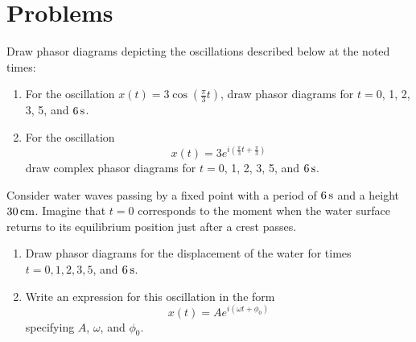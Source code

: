








\newpage


\section*{Problems}


\begin{problem}
Draw phasor diagrams depicting the oscillations described below at the noted times:
  \begin{enumerate}
  \item For the oscillation $x(t) = 3\cos\left(\frac{\pi}{3}t\right)$, draw
phasor diagrams for $t = 0$, 1, 2, 3, 5, and $6\,\mbox{s}$.
  \item For the oscillation 
 \[ x(t) = 3e^{i\left(\frac{\pi}{3}t + \frac{\pi}{3}\right)} \]
draw complex phasor diagrams for $t = 0$, 1, 2, 3, 5, and $6\,\mbox{s}$.
  \end{enumerate}
\end{problem}


\begin{problem}
Consider water waves passing by a fixed point with a period  
of $6\,\mbox{s}$ and a height $30\,\mbox{cm}$. Imagine 
that $t=0$ corresponds to the moment when the water surface returns 
to its equilibrium position just after a crest passes.
  \begin{enumerate}
  \item Draw phasor diagrams for the displacement of the water for times 
$t = 0, 1, 2, 3, 5$, and $6\,\mbox{s}$.
  \item Write an expression for this oscillation in the form
\[ x(t) = Ae^{i\left(\omega t + \phi_0\right)}   \]
specifying $A$, $\omega$, and $\phi_0$.
  \end{enumerate}
\label{prob:waterwaves}
\end{problem}


